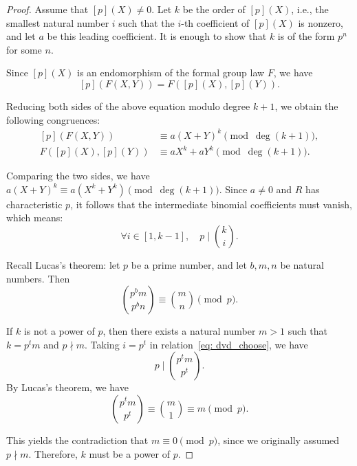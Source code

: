 \begin{proof}
    Assume that $[p](X) \neq 0$. Let $k$ be the order of $[p](X)$, i.e.,
    the smallest natural number $i$ such that the $i$-th coefficient of
    $[p](X)$ is nonzero, and let $a$ be this leading coefficient. It is enough to show that $k$ is of the form $p^n$ for
    some $n$.

    Since $[p](X)$ is an endomorphism of the formal group law $F$, we have
    \[ [p](F(X,Y)) = F([p](X), [p](Y)). \]

    Reducing both sides of the above equation modulo degree $k + 1$,
    we obtain the following congruences:
    \[
    \begin{aligned}
    [p](F(X,Y)) &\equiv a(X + Y)^k \pmod{\deg (k + 1)}, \\
    F([p](X), [p](Y)) &\equiv aX^k + aY^k \pmod{\deg (k + 1)}.
    \end{aligned}
    \]

    Comparing the two sides, we have $a(X + Y)^k \equiv a(X^k + Y^k) \pmod{\deg (k + 1)}$.
    Since $a \neq 0$ and $R$ has characteristic $p$, it follows that the intermediate binomial coefficients must vanish, which means:
    \begin{equation}
        \forall i \in [1, k - 1], \quad p \mid \binom{k}{i}.
        \label{eq: dvd_choose}
    \end{equation}

    Recall Lucas's theorem: let $p$ be a prime number, and let $b, m, n$ be natural numbers. Then
    \[ \binom{p^b m}{p^b n} \equiv \binom{m}{n} \pmod{p}. \]

    If $k$ is not a power of $p$, then there exists a natural number $m > 1$
    such that $k = p^t m$ and $p \nmid m$. Taking $i = p^t$ in
    relation~\eqref{eq: dvd_choose}, we have
    \[ p \mid \binom{p^t m}{p^t}. \]
    By Lucas's theorem, we have
    \[ \binom{p^t m}{p^t} \equiv \binom{m}{1} \equiv m \pmod{p}. \]

    This yields the contradiction that $m \equiv 0 \pmod{p}$, since we originally assumed $p \nmid m$. Therefore, $k$ must be a power of $p$.
\end{proof}



